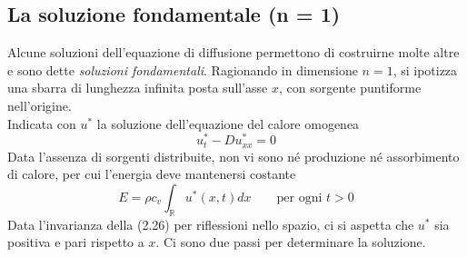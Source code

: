 \documentclass[a4paper,12pt, draft]{article}
\theoremstyle{break}
\numberwithin{equation}{section}
\begin{document}
\subsection{La soluzione fondamentale (n = 1)}
Alcune soluzioni dell'equazione di diffusione permettono di costruirne molte altre e sono dette \emph{soluzioni fondamentali}.
Ragionando in dimensione $n=1$, si ipotizza una sbarra di lunghezza infinita posta sull'asse $x$, con sorgente puntiforme nell'origine. \\
Indicata con $u^*$ la soluzione dell'equazione del calore omogenea
\begin{equation}
u_t^*-Du_{xx}^* = 0
\end{equation}
Data l'assenza di sorgenti distribuite, non vi sono né produzione né assorbimento di calore, per cui l'energia deve mantenersi costante
\begin{equation}
E = \rho c_{v} \int_{\mathbb{R}} u^*(x,t) dx \qquad \mbox{per ogni } t>0
\end{equation}
Data l'invarianza della (2.26) per riflessioni nello spazio, ci si aspetta che $u^*$ sia positiva e pari rispetto a $x$.
Ci sono due passi per determinare la soluzione.
\end{document}
